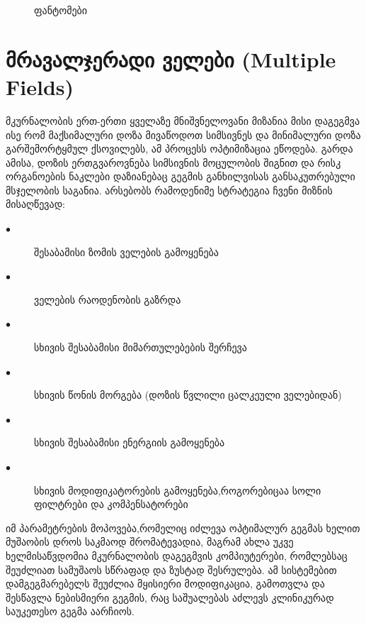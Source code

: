 \documentclass[12pt,a4paper,]{report}
\begin{document}
	\begin{figure}[h]%
    	\centering
    	\qquad
    	\caption{ფანტომები}%
    	\label{fig:phantom}%
	\end{figure}

\section{მრავალჯერადი ველები (Multiple Fields)}
მკურნალობის ერთ-ერთი ყველაზე მნიშვნელოვანი მიზანია მისი დაგეგმვა ისე რომ მაქსიმალური დოზა მივაწოდოთ სიმსივნეს და მინიმალური დოზა გარშემორტყმულ ქსოვილებს, ამ პროცესს ოპტიმიზაცია ეწოდება. გარდა ამისა, დოზის ერთგვაროვნება სიმსივნის მოცულობის შიგნით და რისკ ორგანოების ნაკლები დაზიანებაც გეგმის განხილვისას განსაკუთრებული მსჯელობის საგანია. 
არსებობს რამოდენიმე სტრატეგია ჩვენი მიზნის მისაღწევად:
	\begin{description}
      \item[$\bullet$] შესაბამისი ზომის ველების გამოყენება
      \item[$\bullet$] ველების რაოდენობის გაზრდა
      \item[$\bullet$] სხივის შესაბამისი მიმართულებების შერჩევა
      \item[$\bullet$] სხივის წონის მორგება (დოზის წვლილი ცალკეული ველებიდან)
      \item[$\bullet$] სხივის შესაბამისი ენერგიის გამოყენება
      \item[$\bullet$] სხივის მოდიფიკატორების გამოყენება,როგორებიცაა სოლი ფილტრები და კომპენსატორები
    \end{description}
იმ პარამეტრების მოპოვება,რომელიც იძლევა ოპტიმალურ გეგმას ხელით მუშაობის დროს საკმაოდ შრომატევადია, მაგრამ ახლა უკვე ხელმისაწვდომია მკურნალობის დაგეგმვის კომპიუტერები, რომლებსაც შეუძლიათ სამუშაოს სწრაფად და ზუსტად შესრულება. ამ სისტემებით დამგეგმარებელს შეუძლია მყისიერი მოდიფიკაცია, გამოთვლა და შესწავლა ნებისმიერი გეგმის, რაც საშუალებას აძლევს კლინიკურად საუკეთესო გეგმა აარჩიოს.
\end{document}
